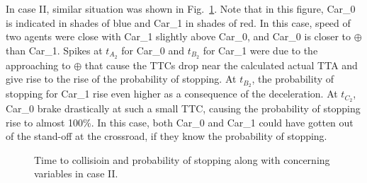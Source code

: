 \documentclass[twocolumn,10pt]{asme2e}
\begin{document}
In case II, similar situation was shown in Fig.~\ref{result_2}. Note that in this figure, Car\_0 is indicated in shades of blue and Car\_1 in shades of red. In this case, speed of two agents were close with Car\_1 slightly above Car\_0, and Car\_0 is closer to $\oplus$ than Car\_1. Spikes at $t_{A_2}$ for Car\_0 and $t_{B_2}$ for Car\_1 were due to the approaching to $\oplus$ that cause the TTCs drop near the calculated actual TTA and give rise to the rise of the probability of stopping. At $t_{B_2}$, the probability of stopping for Car\_1 rise even higher as a consequence of the deceleration. At $t_{C_2}$, Car\_0 brake drastically at such a small TTC, causing the probability of stopping rise to almost 100\%. In this case, both Car\_0 and Car\_1 could have gotten out of the stand-off at the crossroad, if they know the probability of stopping.


\begin{figure}[htbp!]
    \centering
    \hfill
    \hfill
    
    \caption{Time to collisioin and probability of stopping along with concerning variables in case II.} \label{result_2}
\end{figure}
\end{document}
